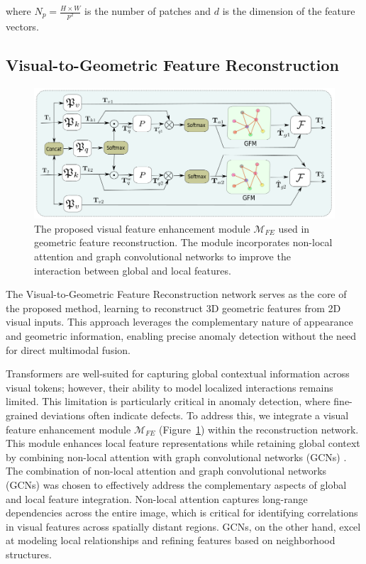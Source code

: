 \noindent where $N_p = \frac{H \times W}{p^2}$ is the number of patches and $d$ is the dimension of the feature vectors. 

\subsection*{Visual-to-Geometric Feature Reconstruction}

\begin{figure}[ht]
\centering
\includegraphics[width=0.8\linewidth]{figs/NL}
\caption{The proposed visual feature enhancement module $\mathcal{M}_{FE}$ used in geometric feature reconstruction. The module incorporates non-local attention and graph convolutional networks to improve the interaction between global and local features.}
\label{fig:NL}
\end{figure}

The Visual-to-Geometric Feature Reconstruction network serves as the core of the proposed method, learning to reconstruct 3D geometric features from 2D visual inputs. This approach leverages the complementary nature of appearance and geometric information, enabling precise anomaly detection without the need for direct multimodal fusion. 

Transformers are well-suited for capturing global contextual information across visual tokens; however, their ability to model localized interactions remains limited. This limitation is particularly critical in anomaly detection, where fine-grained deviations often indicate defects. To address this, we integrate a visual feature enhancement module $\mathcal{M}_{FE}$ (Figure~\ref{fig:NL}) within the reconstruction network. This module enhances local feature representations while retaining global context by combining non-local attention \cite{wang2018non} with graph convolutional networks (GCNs) \cite{defferrard2016convolutional, te2020edge}. The combination of non-local attention and graph convolutional networks (GCNs) was chosen to effectively address the complementary aspects of global and local feature integration. Non-local attention captures long-range dependencies across the entire image, which is critical for identifying correlations in visual features across spatially distant regions. GCNs, on the other hand, excel at modeling local relationships and refining features based on neighborhood structures.

